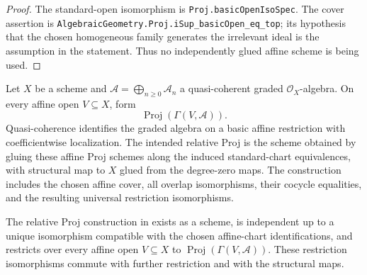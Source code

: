 \begin{proof}
  \leanok
  The standard-open isomorphism is \texttt{Proj.basicOpenIsoSpec}.
  The cover assertion is
  \texttt{AlgebraicGeometry.Proj.iSup\_basicOpen\_eq\_top}; its hypothesis
  that the chosen homogeneous family generates the irrelevant ideal is the
  assumption in the statement.
  Thus no independently glued affine scheme is being used.
\end{proof}

\begin{definition}
  \label{def:nagata-relative-proj}

  Let $X$ be a scheme and
  $\mathcal A=\bigoplus_{n\geq0}\mathcal A_n$ a quasi-coherent graded
  $\mathcal O_X$-algebra.  On every affine open $V\subseteq X$, form
  \[
    \operatorname{Proj}(\Gamma(V,\mathcal A)).
  \]
  Quasi-coherence identifies the graded algebra on a basic affine restriction
  with coefficientwise localization.  The intended relative Proj is the scheme
  obtained by gluing these affine Proj schemes along the induced standard-chart
  equivalences, with structural map to $X$ glued from the degree-zero maps.
  The construction includes the chosen affine cover, all overlap
  isomorphisms, their cocycle equalities, and the resulting universal
  restriction isomorphisms.
\end{definition}

\begin{lemma}
  \label{lemma:nagata-relative-proj-exists}

  The relative Proj construction in
   exists as a scheme, is independent up to a
  unique isomorphism compatible with the chosen affine-chart
  identifications, and restricts over every affine open $V\subseteq X$ to
  $\operatorname{Proj}(\Gamma(V,\mathcal A))$.  These restriction
  isomorphisms commute with further restriction and with the structural maps.
\end{lemma}

